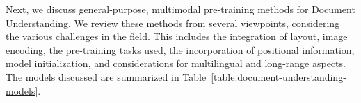 Next, we discuss general-purpose, multimodal pre-training methods for Document Understanding. We review these methods from several viewpoints, considering the various challenges in the field. This includes the integration of layout, image encoding, the pre-training tasks used, the incorporation of positional information, model initialization, and considerations for multilingual and long-range aspects. The models discussed are summarized in Table~\ref{table:document-understanding-models}.


